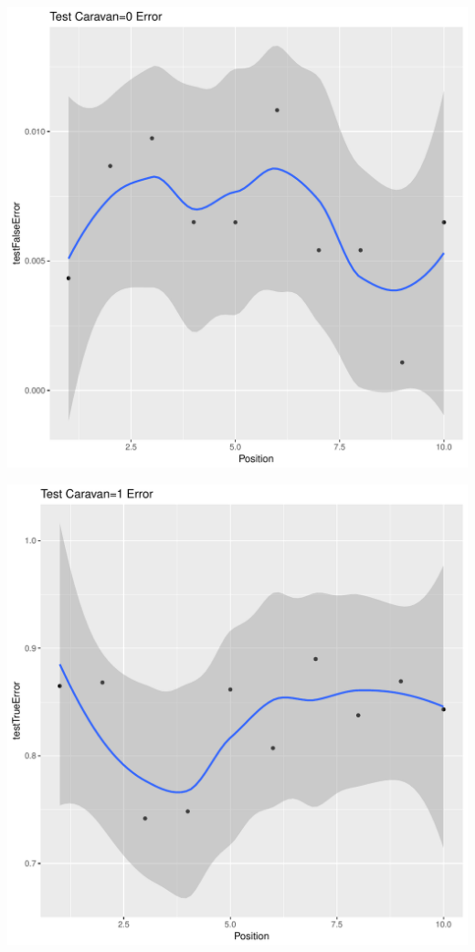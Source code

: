 \documentclass{article}\usepackage[]{graphicx}\usepackage[]{color}
\makeatletter
\def\maxwidth{ %
  \ifdim\Gin@nat@width>\linewidth
    \linewidth
  \else
    \Gin@nat@width
  \fi
}
\newenvironment{kframe}{%
 \def\at@end@of@kframe{}%
 \ifinner\ifhmode%
  \def\at@end@of@kframe{\end{minipage}}%
  \begin{minipage}{\columnwidth}%
 \fi\fi%
 \def\FrameCommand##1{\hskip\@totalleftmargin \hskip-\fboxsep
 \colorbox{shadecolor}{##1}\hskip-\fboxsep
     \hskip-\linewidth \hskip-\@totalleftmargin \hskip\columnwidth}%
 \MakeFramed {\advance\hsize-\width
   \@totalleftmargin\z@ \linewidth\hsize
   \@setminipage}}%
 {\par\unskip\endMakeFramed%
 \at@end@of@kframe}
\newenvironment{knitrout}{}{} %
\makeatother
\begin{document}
\begin{knitrout}
\begin{kframe}
{\ttfamily\noindent\itshape\color{messagecolor}{\#\# `geom\_smooth()` using method = 'loess'}}\end{kframe}
\includegraphics[width=\maxwidth]{figure/unnamed-chunk-35-6} 
\begin{kframe}

{\ttfamily\noindent\itshape\color{messagecolor}{\#\# `geom\_smooth()` using method = 'loess'}}\end{kframe}
\includegraphics[width=\maxwidth]{figure/unnamed-chunk-35-7} 
\begin{kframe}


\end{kframe}
\end{knitrout}
\end{document}

